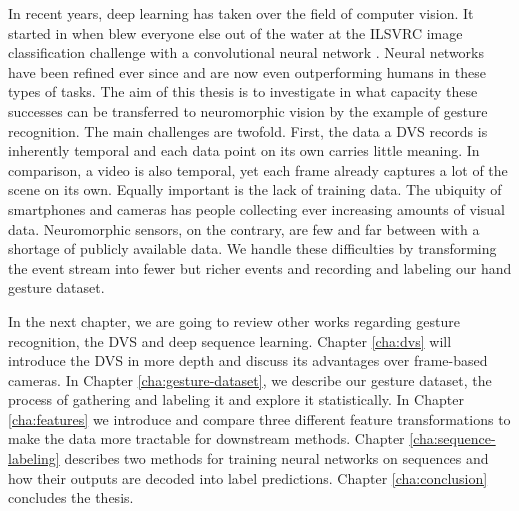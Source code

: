 In recent years, deep learning has taken over the field of computer vision. It
started in \citeyear{alexnet} when \citeauthor{alexnet} blew everyone else out
of the water at the ILSVRC image classification challenge with a convolutional
neural network \cite{alexnet}. Neural networks have been refined ever since and
are now even outperforming humans in these types of tasks. The aim of this
thesis is to investigate in what capacity these successes can be transferred to
neuromorphic vision by the example of gesture recognition. The main challenges
are twofold. First, the data a DVS records is inherently temporal and each data
point on its own carries little meaning. In comparison, a video is also
temporal, yet each frame already captures a lot of the scene on its own. Equally
important is the lack of training data. The ubiquity of smartphones and cameras
has people collecting ever increasing amounts of visual data. Neuromorphic
sensors, on the contrary, are few and far between with a shortage of publicly
available data. We handle these difficulties by transforming the event stream
into fewer but richer events and recording and labeling our hand gesture
dataset.

In the next chapter, we are going to review other works regarding gesture
recognition, the DVS and deep sequence learning. Chapter \ref{cha:dvs} will
introduce the DVS in more depth and discuss its advantages over frame-based
cameras. In Chapter \ref{cha:gesture-dataset}, we describe our gesture dataset,
the process of gathering and labeling it and explore it statistically. In
Chapter \ref{cha:features} we introduce and compare three different feature
transformations to make the data more tractable for downstream methods. Chapter
\ref{cha:sequence-labeling} describes two methods for training neural networks
on sequences and how their outputs are decoded into label predictions. Chapter
\ref{cha:conclusion} concludes the thesis.
